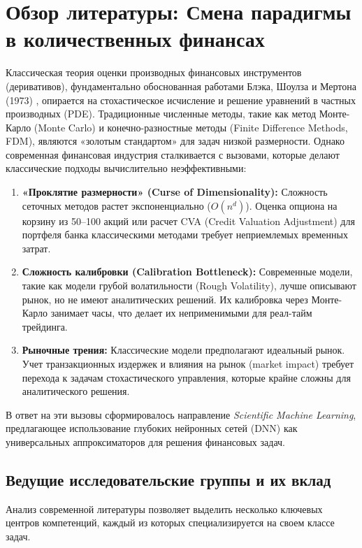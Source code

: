 \section{Обзор литературы: Смена парадигмы в количественных финансах}

Классическая теория оценки производных финансовых инструментов (деривативов), фундаментально обоснованная работами Блэка, Шоулза и Мертона (1973) \cite{BlackScholes1973}, опирается на стохастическое исчисление и решение уравнений в частных производных (PDE). Традиционные численные методы, такие как метод Монте-Карло (Monte Carlo) и конечно-разностные методы (Finite Difference Methods, FDM), являются «золотым стандартом» для задач низкой размерности. Однако современная финансовая индустрия сталкивается с вызовами, которые делают классические подходы вычислительно неэффективными:
\begin{enumerate}
    \item \textbf{«Проклятие размерности» (Curse of Dimensionality):} Сложность сеточных методов растет экспоненциально ($O(n^d)$). Оценка опциона на корзину из 50--100 акций или расчет CVA (Credit Valuation Adjustment) для портфеля банка классическими методами требует неприемлемых временных затрат.
    \item \textbf{Сложность калибровки (Calibration Bottleneck):} Современные модели, такие как модели грубой волатильности (Rough Volatility), лучше описывают рынок, но не имеют аналитических решений. Их калибровка через Монте-Карло занимает часы, что делает их неприменимыми для реал-тайм трейдинга.
    \item \textbf{Рыночные трения:} Классические модели предполагают идеальный рынок. Учет транзакционных издержек и влияния на рынок (market impact) требует перехода к задачам стохастического управления, которые крайне сложны для аналитического решения.
\end{enumerate}

В ответ на эти вызовы сформировалось направление \textit{Scientific Machine Learning}, предлагающее использование глубоких нейронных сетей (DNN) как универсальных аппроксиматоров для решения финансовых задач.

\subsection{Ведущие исследовательские группы и их вклад}

Анализ современной литературы позволяет выделить несколько ключевых центров компетенций, каждый из которых специализируется на своем классе задач.

